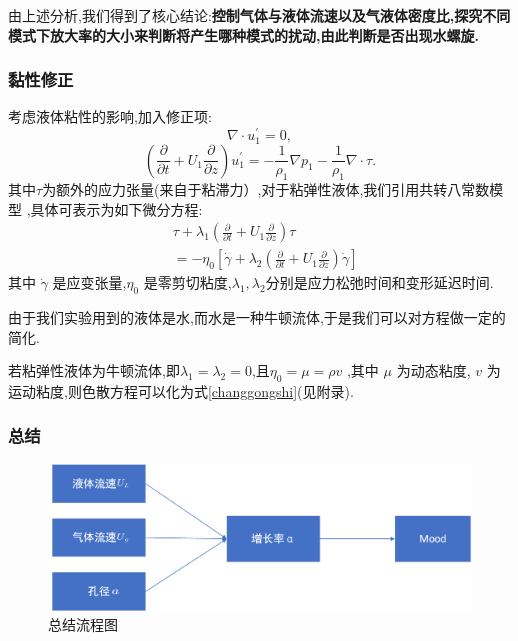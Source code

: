 \documentclass[UTF8]{gapd}
\begin{document}
由上述分析,我们得到了核心结论:\textbf{控制气体与液体流速以及气液体密度比,探究不同模式下放大率的大小来判断将产生哪种模式的扰动,由此判断是否出现水螺旋.}

\subsubsection{黏性修正}
考虑液体粘性的影响,加入修正项:
\begin{equation}
\nabla \cdot u_{1}^{'}=0,
\end{equation}
\begin{equation}
\left( \frac{\partial}{\partial t}+U_1\frac{\partial}{\partial z} \right) u_{1}^{'}=-\frac{1}{\rho _1}\nabla p_1-\frac{1}{\rho _1}\nabla \cdot \tau .
\end{equation}
其中$\tau$为额外的应力张量(来自于粘滞力）,对于粘弹性液体,我们引用共转八常数模型\cite{c4} ,具体可表示为如下微分方程:
\begin{equation}
\begin{split}
&\tau+\lambda_{1}\left(\frac{\partial}{\partial t}+U_{1} \frac{\partial}{\partial z}\right) \tau\\&=-\eta_{0}\left[\dot{\gamma}+\lambda_{2}\left(\frac{\partial}{\partial t}+U_{1} \frac{\partial}{\partial z}\right) \dot{\gamma}\right]
\end{split}
\end{equation}
其中  $\dot{\gamma}$ 是应变张量,$\eta _0$  是零剪切粘度,$\lambda _1,\lambda _2$分别是应力松弛时间和变形延迟时间.

由于我们实验用到的液体是水,而水是一种牛顿流体,于是我们可以对方程做一定的简化.

若粘弹性液体为牛顿流体,即$\lambda _1=\lambda _2=0$,且$ \eta _0=\mu =\rho v $ ,其中 $\mu$  为动态粘度, $v$   为运动粘度,则色散方程可以化为式\ref{changgongshi}(见附录).


\subsubsection{总结}
\begin{figure}[h]%
	\centering
	\includegraphics[width=0.9\columnwidth]{images/流程图1}
	\caption{总结流程图}
	\label{fig:P4}%
\end{figure}
\end{document}
